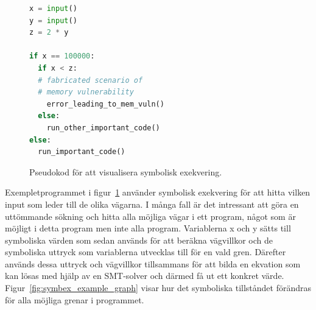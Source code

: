\begin{figure}
    \begin{lstlisting}[language=Python, frame=single]
x = input()
y = input()
z = 2 * y

if x == 100000:
  if x < z:
  # fabricated scenario of
  # memory vulnerability
    error_leading_to_mem_vuln()
  else:
    run_other_important_code()
else:
  run_important_code()

\end{lstlisting}
    \caption{Pseudokod för att visualisera symbolisk exekvering.}
    \label{fig:symbex_example_code}
\end{figure}

Exempletprogrammet i figur~\ref{fig:symbex_example_code} använder
symbolisk exekvering för att hitta vilken input som leder till de olika
vägarna. I många fall är det intressant att göra en uttömmande
sökning och hitta alla möjliga vägar i ett program, något som är möjligt i detta
program men inte alla program. Variablerna x och y sätts till symboliska värden
som sedan används för att beräkna vägvillkor och de symboliska uttryck som
variablerna utvecklas till för en vald gren. Därefter används dessa uttryck
och vägvillkor tillsammans för att bilda en ekvation som kan lösas med
hjälp av en SMT-solver och därmed få ut ett konkret värde.
Figur~\ref{fig:symbex_example_graph} visar hur det symboliska tillståndet
förändras för alla möjliga grenar i programmet.


